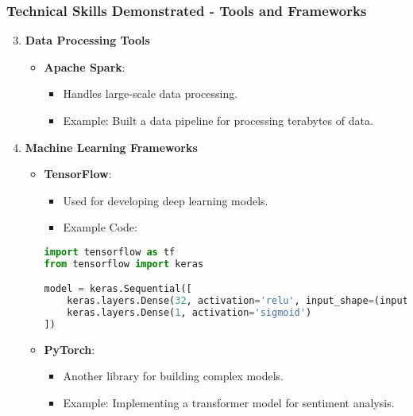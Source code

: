 \documentclass[aspectratio=169]{beamer}
\begin{document}
\begin{frame}[fragile]
  \frametitle{Technical Skills Demonstrated - Tools and Frameworks}
  \begin{enumerate}
    \setcounter{enumi}{2}
    \item \textbf{Data Processing Tools}
    \begin{itemize}
      \item \textbf{Apache Spark}:
      \begin{itemize}
        \item Handles large-scale data processing.
        \item Example: Built a data pipeline for processing terabytes of data.
      \end{itemize}
    \end{itemize}
    \item \textbf{Machine Learning Frameworks}
    \begin{itemize}
      \item \textbf{TensorFlow}:
      \begin{itemize}
        \item Used for developing deep learning models.
        \item Example Code:
        \end{itemize}
        \begin{lstlisting}[language=Python]
import tensorflow as tf
from tensorflow import keras

model = keras.Sequential([
    keras.layers.Dense(32, activation='relu', input_shape=(input_shape,)),
    keras.layers.Dense(1, activation='sigmoid')
])
        \end{lstlisting}
      \item \textbf{PyTorch}:
      \begin{itemize}
        \item Another library for building complex models.
        \item Example: Implementing a transformer model for sentiment analysis.
      \end{itemize}
    \end{itemize}
  \end{enumerate}
\end{frame}
\end{document}
